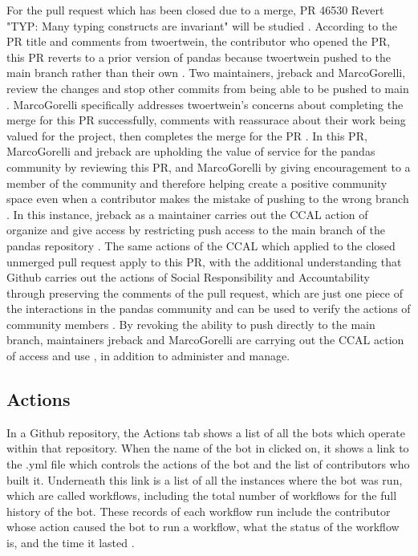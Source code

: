 For the pull request which has been closed due to a merge, PR 46530 Revert "TYP: Many typing constructs are invariant" will be studied \cite{pandasrepo}. According to the PR title and comments from twoertwein, the contributor who opened the PR, this PR reverts to a prior version of pandas because twoertwein pushed to the main branch rather than their own \cite{pandasrepo}. Two maintainers, jreback and MarcoGorelli, review the changes and stop other commits from being able to be pushed to main \cite{pandasrepo}. MarcoGorelli specifically addresses twoertwein's concerns about completing the merge for this PR successfully, comments with reassurace about their work being valued for the project, then completes the merge for the PR \cite{pandasrepo}. In this PR, MarcoGorelli and jreback are upholding the value of service for the pandas community by reviewing this PR, and MarcoGorelli by giving encouragement to a member of the community and therefore helping create a positive community space even when a contributor makes the mistake of pushing to the wrong branch \cite{pandasrepo}\cite{gorman2000values}\cite{rubin2016foundationslis}. In this instance, jreback as a maintainer carries out the CCAL action of organize and give access by restricting push access to the main branch of the pandas repository \cite{gorman2000values}. The same actions of the CCAL which applied to the closed unmerged pull request apply to this PR, with the additional understanding that Github carries out the actions of Social Responsibility and Accountability through preserving the comments of the pull request, which are just one piece of the interactions in the pandas community and can be used to verify the actions of community members \cite{rubin2016foundationslis}. By revoking the ability to push directly to the main branch, maintainers jreback and MarcoGorelli are carrying out the CCAL action of access and use \cite{rubin2016foundationslis}, in addition to administer and manage\cite{gorman2000values}. 

\subsection{Actions}

In a Github repository, the Actions tab shows a list of all the bots which operate within that repository. When the name of the bot in clicked on, it shows a link to the .yml file which controls the actions of the bot and the list of contributors who built it. Underneath this link is a list of all the instances where the bot was run, which are called workflows, including the total number of workflows for the full history of the bot. These records of each workflow run include the contributor whose action caused the bot to run a workflow, what the status of the workflow is, and the time it lasted \cite{pandasrepo}.

